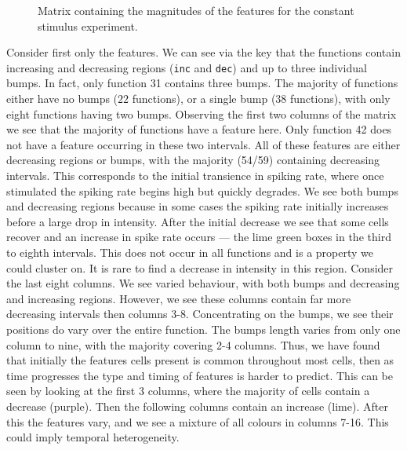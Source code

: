\documentclass[../main.tex]{subfiles}
\begin{document}
	\begin{figure}
  \begin{center} 
    \end{center}     
    \caption{Matrix containing the magnitudes of the features for the constant stimulus experiment.}
    \label{fig:Colin2_sizes}
	\end{figure}


Consider first only the features. We can see via the key that the functions contain increasing and decreasing regions ({\tt inc} and {\tt dec}) and up to three individual bumps. In fact, only function 31 contains three bumps. The majority of functions either have no bumps ($22$ functions), or a single bump ($38$ functions), with only eight functions having two bumps. Observing the first two columns of the matrix we see that the majority of functions have a feature here. Only function 42 does not have a feature occurring in these two intervals. All of these features are either decreasing regions or bumps, with the majority (54/59) containing decreasing intervals. This corresponds to the initial transience in spiking rate, where once stimulated the spiking rate begins high but quickly degrades. We see both bumps and decreasing regions because in some cases the spiking rate initially increases before a large drop in intensity. After the initial decrease we see that some cells recover and an increase in spike rate occurs --- the lime green boxes in the third to eighth intervals. This does not occur in all functions and is a property we could cluster on. It is rare to find a decrease in intensity in this region. Consider the last eight columns. We see varied behaviour, with both bumps and decreasing and increasing regions. However, we see these columns contain far more decreasing intervals then columns 3-8. Concentrating on the bumps, we see their positions do vary over the entire function. The bumps length varies from only one column to nine, with the majority covering 2-4 columns. Thus, we have found that initially the features cells present is common throughout most cells, then as time progresses the type and timing of features is harder to predict. This can be seen by looking at the first 3 columns, where the majority of cells contain a decrease (purple). Then the following columns contain an increase (lime). After this the features vary, and we see a mixture of all colours in columns 7-16. This could imply temporal heterogeneity. 
\end{document}
